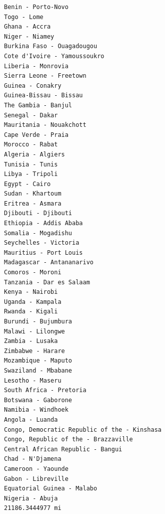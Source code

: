 \documentclass[12pt]{article}
\begin{document}
\begin{verbatim}
Benin - Porto-Novo
Togo - Lome
Ghana - Accra
Niger - Niamey
Burkina Faso - Ouagadougou
Cote d'Ivoire - Yamoussoukro
Liberia - Monrovia
Sierra Leone - Freetown
Guinea - Conakry
Guinea-Bissau - Bissau
The Gambia - Banjul
Senegal - Dakar
Mauritania - Nouakchott
Cape Verde - Praia
Morocco - Rabat
Algeria - Algiers
Tunisia - Tunis
Libya - Tripoli
Egypt - Cairo
Sudan - Khartoum
Eritrea - Asmara
Djibouti - Djibouti
Ethiopia - Addis Ababa
Somalia - Mogadishu
Seychelles - Victoria
Mauritius - Port Louis
Madagascar - Antananarivo
Comoros - Moroni
Tanzania - Dar es Salaam
Kenya - Nairobi
Uganda - Kampala
Rwanda - Kigali
Burundi - Bujumbura
Malawi - Lilongwe
Zambia - Lusaka
Zimbabwe - Harare
Mozambique - Maputo
Swaziland - Mbabane
Lesotho - Maseru
South Africa - Pretoria 
Botswana - Gaborone
Namibia - Windhoek
Angola - Luanda
Congo, Democratic Republic of the - Kinshasa
Congo, Republic of the - Brazzaville
Central African Republic - Bangui
Chad - N'Djamena
Cameroon - Yaounde
Gabon - Libreville
Equatorial Guinea - Malabo
Nigeria - Abuja
21186.3444977 mi
\end{verbatim}
\end{document}
